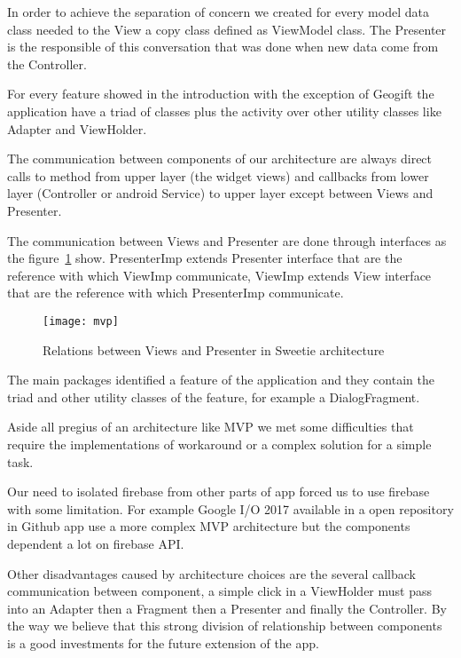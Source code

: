 In order to achieve the separation of concern we created for every model data class needed to the View a copy class defined as ViewModel class. The Presenter is the responsible of this conversation that was done when new data come from the Controller. 

For every feature showed in the introduction with the exception of Geogift the application have a triad of classes plus the activity over other utility classes like Adapter and ViewHolder. 

The communication between components of our architecture are always direct calls to method from upper layer (the widget views) and callbacks from lower layer (Controller or android Service) to upper layer except between Views and Presenter.

The communication between Views and Presenter are done through interfaces as the figure~\ref{fig:MVP_image} show. PresenterImp extends Presenter interface that are the reference with which ViewImp communicate, ViewImp extends View interface that are the reference with which PresenterImp communicate.

\begin{figure}[h]
	\texttt{[image: mvp]}
	\caption{Relations between Views and Presenter in Sweetie architecture}
	\label{fig:MVP_image}
\end{figure}

The main packages identified a feature of the application and they contain the triad and other utility classes of the feature, for example a DialogFragment.

Aside all pregius of an architecture like MVP we met some difficulties that require the implementations of workaround or a complex solution for a simple task. 

Our need to isolated firebase from other parts of app forced us to use firebase with some limitation. For example Google I/O 2017 available in a open repository in Github \cite{GoogleIO} app use a more complex MVP architecture but the components dependent a lot on firebase API.

Other disadvantages caused by architecture choices are the several callback communication between component, a simple click in a ViewHolder must pass into an Adapter then a Fragment then a Presenter and finally the Controller. By the way we believe that this strong division of relationship between components is a good investments for the future extension of the app.

